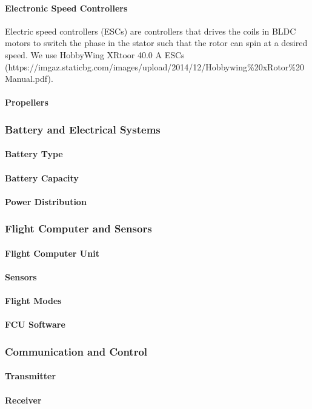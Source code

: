 \paragraph{Electronic Speed Controllers}

Electric speed controllers (ESCs) are controllers that drives the coils in BLDC motors to switch the phase in the stator such that the rotor can spin at a desired speed. We use HobbyWing XRtoor 40.0 A  ESCs (https://imgaz.staticbg.com/images/upload/2014/12/Hobbywing\%20xRotor\%20Manual.pdf). 

\paragraph{Propellers}



\subsubsection{Battery and Electrical Systems}
\paragraph{Battery Type}
\paragraph{Battery Capacity}
\paragraph{Power Distribution}

\subsubsection{Flight Computer and Sensors}
\paragraph{Flight Computer Unit}
\paragraph{Sensors}
\paragraph{Flight Modes}
\paragraph{FCU Software}

\subsubsection{Communication and Control}
\paragraph{Transmitter}
\paragraph{Receiver}
